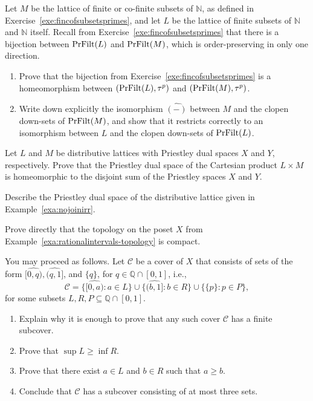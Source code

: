 \begin{exercise}\label{exe:fincofsubsetsspace}
  Let $M$ be the lattice of finite or co-finite subsets of $\mathbb{N}$, as defined in Exercise~\ref{exe:fincofsubsetsprimes}, and let $L$ be the lattice of finite subsets of $\mathbb{N}$ and $\mathbb{N}$ itself. Recall from Exercise~\ref{exe:fincofsubsetsprimes} that there is a bijection between $\mathrm{PrFilt}(L)$ and $\mathrm{PrFilt}(M)$, which is order-preserving in only one direction.
  \begin{enumerate}
  \item Prove that the bijection from Exercise~\ref{exe:fincofsubsetsprimes} is a homeomorphism between $(\mathrm{PrFilt}(L),\tau^p)$ and $(\mathrm{PrFilt}(M),\tau^p)$.
  \item Write down explicitly the isomorphism $\widehat{(-)}$ between $M$ and the clopen down-sets of $\mathrm{PrFilt}(M)$, and show that it restricts correctly to an isomorphism between $L$ and the clopen down-sets of $\mathrm{PrFilt}(L)$.
  \end{enumerate}
\end{exercise}

\exercise \label{exe:sumproduct}
Let $L$ and $M$ be distributive lattices with Priestley dual spaces $X$ and $Y$, respectively. Prove that the Priestley dual space of the Cartesian product $L \times M$ is homeomorphic to the disjoint sum of the Priestley spaces $X$ and $Y$. 

\exercise \label{exe:dualofNsquaredlattice}
Describe the Priestley dual space of the distributive lattice given in Example~\ref{exa:nojoinirr}.

\exercise \label{exe:compact-rational-intervals}
Prove directly that the topology on the poset $X$ from Example~\ref{exa:rationalintervals-topology} is compact. 

You may proceed as follows. Let $\mathcal{C}$ be a cover of $X$ that consists of sets of the form $\widehat{[0,q)}, \widehat{(q,1]}$, and $\{q\}$, for $q \in \mathbb{Q} \cap [0,1]$, i.e., 
\[\mathcal{C} = \{ \widehat{[0,a)} : a \in L \} \cup \{ \widehat{(b,1]} : b \in R\} \cup \{ \{p \} : p \in P \},\]
for some subsets $L, R, P \subseteq \mathbb{Q} \cap [0,1]$.
\begin{enumerate}
\item Explain why it is enough to prove that any such cover $\mathcal{C}$ has a finite subcover. 
\item Prove that $\sup L \geq \inf R$.
\item Prove that there exist $a \in L$ and $b \in R$ such that $a \geq b$. 
\item Conclude that $\mathcal{C}$ has a subcover consisting of at most three sets.
\end{enumerate}
  
